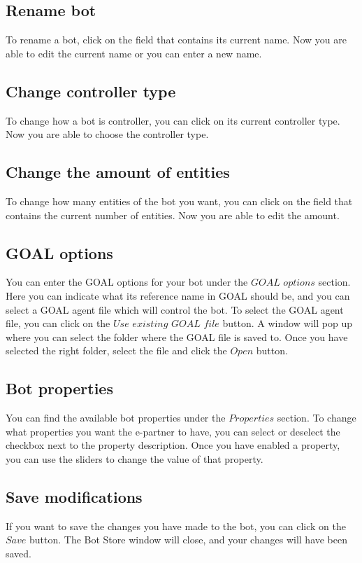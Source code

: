 \documentclass[a4paper]{article}
\begin{document}
\subsection{Rename bot}
To rename a bot, click on the field that contains its current name. Now you are able to edit the current name or you can enter a new name.

\subsection{Change controller type}
To change how a bot is controller, you can click on its current controller type. Now you are able to choose the controller type.

\subsection{Change the amount of entities}
To change how many entities of the bot you want, you can click on the field that contains the current number of entities. Now you are able to edit the amount.

\subsection{GOAL options}
You can enter the GOAL options for your bot under the $GOAL$ $options$ section. Here you can indicate what its reference name in GOAL should be, and you can select a GOAL agent file which will control the bot. To select the GOAL agent file, you can click on the $Use$ $existing$ $GOAL$ $file$ button. A window will pop up where you can select the folder where the GOAL file is saved to. Once you have selected the right folder, select the file and click the $Open$ button.

\subsection{Bot properties}
You can find the available bot properties under the $Properties$ section. To change what properties you want the e-partner to have, you can select or deselect the checkbox next to the property description. Once you have enabled a property, you can use the sliders to change the value of that property.

\subsection{Save modifications}
If you want to save the changes you have made to the bot, you can click on the $Save$ button. The Bot Store window will close, and your changes will have been saved.
\end{document}
